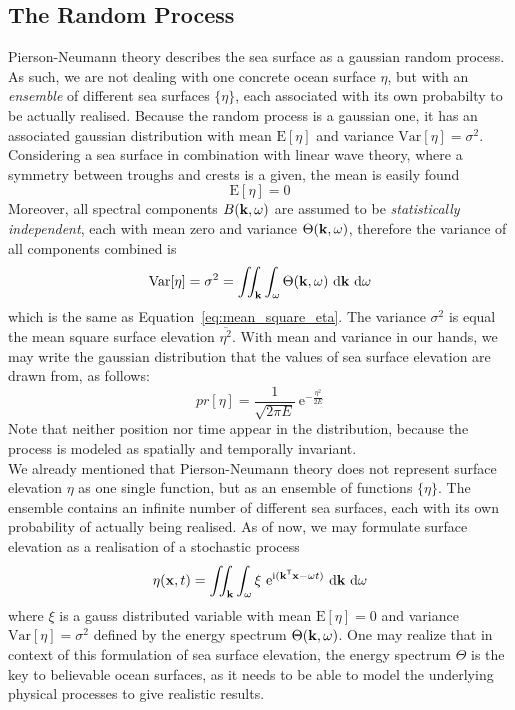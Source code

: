 \subsection{The Random Process}
\label{sec:random_process}
Pierson-Neumann theory describes the sea surface as a gaussian random process.
As such, we are not dealing with one concrete ocean surface $\eta$, but with an
\emph{ensemble} of different sea surfaces $\{\eta\}$, each associated with its
own probabilty to be actually realised. Because the random process is a
gaussian one, it has an associated gaussian distribution with mean
$\mathrm{E}[\eta]$ and variance $\mathrm{Var}[\eta] = \sigma^2$. Considering a
sea surface in combination with linear wave theory, where a symmetry between
troughs and crests is a given, the mean is easily found
\begin{equation}
 \mathrm{E}[\eta] = 0
\end{equation}
%
Moreover, all spectral components $B(\mathbf{k},\omega)$ are assumed to be
\emph{statistically independent}, each with mean zero and variance $\Theta(\mathbf{k},\omega)$,
therefore the variance of all components combined is
\begin{equation}
\label{eq:random_process_variance}
\mathrm{Var}[\eta] = \sigma^2 = \iint_{\mathbf{k}}
\int_{\omega}\Theta(\mathbf{k},\omega)~\mathrm{d}\mathbf{k}~\mathrm{ d}\omega
\end{equation}
which is the same as Equation~\ref{eq:mean_square_eta}. The variance
$\sigma^2$ is equal the mean square surface elevation $\overline{\eta^2}$. With
mean and variance in our hands, we may write the gaussian distribution that the
values of sea surface elevation are drawn from, as follows:
\begin{equation}
\label{eq:gaussian_dist}
 pr[\eta] = \frac{1}{\sqrt{2\pi E}}~\mathrm{e}^{-\frac{\eta^2}{2E}}
\end{equation}
Note that neither position nor time appear in the distribution, because the
process is modeled as spatially and temporally invariant.\\

We already mentioned that Pierson-Neumann theory does not represent surface
elevation $\eta$ as one single function, but as an ensemble of functions
$\{\eta\}$. The ensemble contains an infinite number of different sea surfaces,
each with its own probability of actually being realised. As of now, we may
formulate surface elevation as a realisation of a stochastic process
\begin{equation}
\label{eq:surface_elevation_gauss}
 \eta(\mathbf{x}, t) = \iint_{\mathbf{k}}\int_{\omega} \xi
~\mathrm{e}^{\mathrm{i}(\mathbf{k}^{\mathsf{T}}\mathbf{x}-
\omega t)}~
\mathrm{d}\mathbf{k}~\mathrm{d}\omega
\end{equation}
where $\xi$ is a gauss distributed variable with mean $\mathrm{E}[\eta] = 0$ and
variance $\mathrm{Var}[\eta] = \sigma^2$ defined by the energy spectrum
$\Theta(\mathbf{k}, \omega)$. One may realize that in context of this formulation
of sea surface elevation, the energy spectrum $\Theta$ is the key to believable
ocean surfaces, as it needs to be able to model the underlying physical
processes to give realistic results.\\


